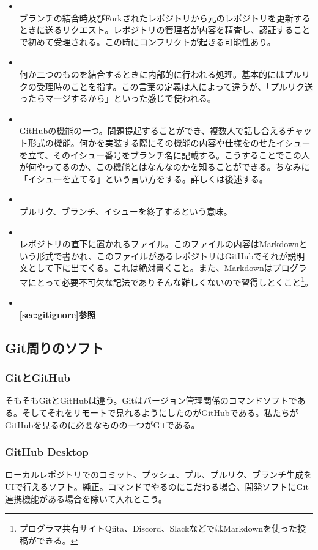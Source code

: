 \documentclass[dvipdfmx,jb5]{jarticle}
\begin{document}
\begin{itemize}
\item {}\\
ブランチの結合時及びForkされたレポジトリから元のレポジトリを更新するときに送るリクエスト。レポジトリの管理者が内容を精査し、認証することで初めて受理される。この時にコンフリクトが起きる可能性あり。
\item {}\\
何か二つのものを結合するときに内部的に行われる処理。基本的にはプルリクの受理時のことを指す。この言葉の定義は人によって違うが、「プルリク送ったらマージするから」といった感じで使われる。
\item {}\\
GitHubの機能の一つ。問題提起することができ、複数人で話し合えるチャット形式の機能。何かを実装する際にその機能の内容や仕様をのせたイシューを立て、そのイシュー番号をブランチ名に記載する。こうすることでこの人が何やってるのか、この機能とはなんなのかを知ることができる。ちなみに「イシューを立てる」という言い方をする。詳しくは後述する。
\item {}\\
プルリク、ブランチ、イシューを終了するという意味。
\item {}\\
レポジトリの直下に置かれるファイル。このファイルの内容はMarkdownという形式で書かれ、このファイルがあるレポジトリはGitHubでそれが説明文として下に出てくる。これは絶対書くこと。また、Markdownはプログラマにとって必要不可欠な記法でありそんな難しくないので習得しとくこと\footnote{プログラマ共有サイトQiita、Discord、SlackなどではMarkdownを使った投稿ができる。}。
\item {}\\
{\bf\ref{sec:gitignore}参照}
\end{itemize}
\subsection{Git周りのソフト}
\subsubsection{GitとGitHub}
そもそもGitとGitHubは違う。Gitはバージョン管理関係のコマンドソフトである。そしてそれをリモートで見れるようにしたのがGitHubである。私たちがGitHubを見るのに必要なものの一つがGitである。
\subsubsection{GitHub Desktop}
ローカルレポジトリでのコミット、プッシュ、プル、プルリク、ブランチ生成をUIで行えるソフト。純正。コマンドでやるのにこだわる場合、開発ソフトにGit連携機能がある場合を除いて入れとこう。
\end{document}
